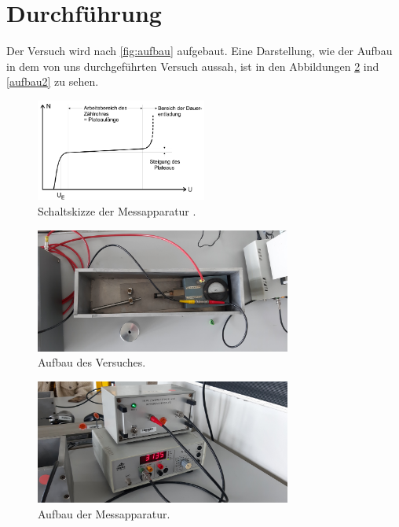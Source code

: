 \section{Durchführung}
\label{sec:Durchführung}

Der Versuch wird nach \autoref{fig:aufbau} aufgebaut. Eine Darstellung, wie der Aufbau in dem von uns durchgeführten Versuch aussah, ist in den Abbildungen \ref{fig:aufbau1} ind \ref{aufbau2} zu sehen.
\begin{figure}[H]
    \centering
    \includegraphics[width=0.5\textwidth]{data/charakteristik.png}
    \caption{Schaltskizze der Messapparatur \cite{Anleitung703}.}
    \label{fig:aufbau}
\end{figure}

\begin{figure}[H]
    \centering
    \includegraphics[width=0.75\textwidth]{data/kasten.jpg}
    \caption{Aufbau des Versuches.}
    \label{fig:aufbau1}
\end{figure}

\begin{figure}[H]
    \centering
    \includegraphics[width=0.75\textwidth]{data/geigerMueller.jpg}
    \caption{Aufbau der Messapparatur.}
    \label{fig:aufbau2}
\end{figure}

